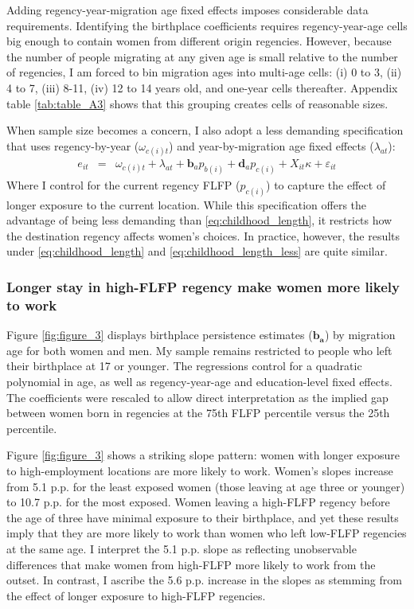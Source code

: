 Adding regency-year-migration age fixed effects imposes considerable data requirements. Identifying the birthplace coefficients requires regency-year-age cells big enough to contain women from different origin regencies. However, because the number of people migrating at any given age is small relative to the number of regencies, I am forced to bin migration ages into multi-age cells: (i) 0 to 3, (ii) 4 to 7, (iii) 8-11, (iv) 12 to 14 years old, and one-year cells thereafter. Appendix table \ref{tab:table_A3} shows that this grouping creates cells of reasonable sizes.

When sample size becomes a concern, I also adopt a less demanding specification that uses regency-by-year ($\omega_{c(i)t}$) and year-by-migration age fixed effects ($\lambda_{at}$):
\begin{eqnarray}
	\label{eq:childhood_length_less}
	e_{it}&=&\omega_{c(i)t}+\lambda_{at}+\boldsymbol b_a p_{b(i)} +\boldsymbol d_a p_{c(i)}+X_{it}\kappa+\varepsilon_{it}
\end{eqnarray}
Where I control for the current regency FLFP ($p_{c(i)}$) to capture the effect of longer exposure to the current location. While this specification offers the advantage of being less demanding than \eqref{eq:childhood_length}, it restricts how the destination regency affects women's choices. In practice, however, the results under  \eqref{eq:childhood_length}
and  \eqref{eq:childhood_length_less} are quite similar.


\subsubsection{Longer stay in high-FLFP regency make women more likely to work}

Figure \ref{fig:figure_3} displays birthplace persistence estimates ($\boldsymbol{b_{a}}$)  by migration age for both women and men. My sample remains restricted to people who left their birthplace at 17 or younger. The regressions control for a quadratic polynomial in age, as well as regency-year-age and education-level fixed effects. The coefficients were rescaled to allow direct interpretation as the implied gap between women born in regencies at the 75th FLFP percentile versus the 25th percentile.

\tftext{}


Figure \ref{fig:figure_3} shows a striking slope pattern: women with longer exposure to high-employment locations are more likely to work. Women's slopes increase from 5.1 p.p. for the least exposed women (those leaving at age three or younger) to 10.7 p.p. for the most exposed. Women leaving a high-FLFP regency before the age of three have minimal exposure to their birthplace, and yet these results imply that they are more likely to work than women who left low-FLFP regencies at the same age. I interpret the 5.1 p.p. slope as reflecting unobservable differences that make women from high-FLFP more likely to work from the outset. In contrast, I ascribe the 5.6 p.p. increase in the slopes as stemming from the effect of longer exposure to high-FLFP regencies.


